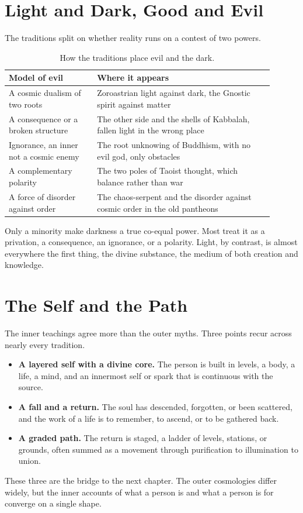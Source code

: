 \section{Light and Dark, Good and Evil}

The traditions split on whether reality runs on a contest of two powers.

\begin{longtable}{L{0.30\linewidth} L{0.60\linewidth}}
\caption{How the traditions place evil and the dark.}\\
\toprule
\textbf{Model of evil} & \textbf{Where it appears} \\
\midrule
A cosmic dualism of two roots & Zoroastrian light against dark, the Gnostic spirit against matter \\
A consequence or a broken structure & The other side and the shells of Kabbalah, fallen light in the wrong place \\
Ignorance, an inner not a cosmic enemy & The root unknowing of Buddhism, with no evil god, only obstacles \\
A complementary polarity & The two poles of Taoist thought, which balance rather than war \\
A force of disorder against order & The chaos-serpent and the disorder against cosmic order in the old pantheons \\
\bottomrule
\end{longtable}

Only a minority make darkness a true co-equal power. Most treat it as a privation, a consequence, an
ignorance, or a polarity. Light, by contrast, is almost everywhere the first thing, the divine substance, the
medium of both creation and knowledge.

\section{The Self and the Path}

The inner teachings agree more than the outer myths. Three points recur across nearly every tradition.

\begin{itemize}
  \item \textbf{A layered self with a divine core.} The person is built in levels, a body, a life, a mind,
  and an innermost self or spark that is continuous with the source.
  \item \textbf{A fall and a return.} The soul has descended, forgotten, or been scattered, and the work of a
  life is to remember, to ascend, or to be gathered back.
  \item \textbf{A graded path.} The return is staged, a ladder of levels, stations, or grounds, often summed
  as a movement through purification to illumination to union.
\end{itemize}

These three are the bridge to the next chapter. The outer cosmologies differ widely, but the inner accounts
of what a person is and what a person is for converge on a single shape.
